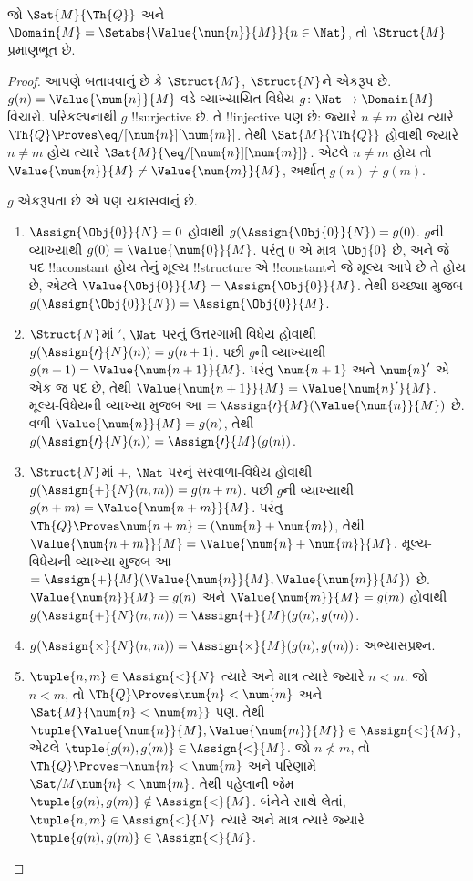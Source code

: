 \documentclass[../../../include/open-logic-section]{subfiles}
\begin{document}
\begin{prop}
જો $\Sat{M}{\Th{Q}}$ અને
$\Domain{M}=\Setabs{\Value{\num{n}}{M}}{n\in\Nat}$, તો
$\Struct{M}$ પ્રમાણભૂત છે.
\end{prop}

\begin{proof}
આપણે બતાવવાનું છે કે $\Struct{M}$, $\Struct{N}$ને એકરૂપ છે.
$g(n)=\Value{\num{n}}{M}$ વડે વ્યાખ્યાયિત વિધેય
$g\colon\Nat\to\Domain{M}$ વિચારો. પરિકલ્પનાથી $g$ !!{surjective}
છે. તે !!{injective} પણ છે: જ્યારે $n\neq m$ હોય ત્યારે
$\Th{Q}\Proves\eq/[\num{n}][\num{m}]$. તેથી
$\Sat{M}{\Th{Q}}$ હોવાથી જ્યારે $n\neq m$ હોય ત્યારે
$\Sat{M}{\eq/[\num{n}][\num{m}]}$. એટલે $n\neq m$ હોય તો
$\Value{\num{n}}{M}\neq\Value{\num{m}}{M}$, અર્થાત્ $g(n)\neq g(m)$.

$g$ એકરૂપતા છે એ પણ ચકાસવાનું છે.
\begin{enumerate}
\item $\Assign{\Obj{0}}{N}=0$ હોવાથી
  $g(\Assign{\Obj{0}}{N})=g(0)$. $g$ની વ્યાખ્યાથી
  $g(0)=\Value{\num{0}}{M}$. પરંતુ $\num{0}$ એ માત્ર $\Obj{0}$ છે,
  અને જે પદ !!a{constant} હોય તેનું મૂલ્ય !!{structure} એ
  !!{constant}ને જે મૂલ્ય આપે છે તે હોય છે, એટલે
  $\Value{\Obj{0}}{M}=\Assign{\Obj{0}}{M}$. તેથી ઇચ્છ્યા મુજબ
  $g(\Assign{\Obj{0}}{N})=\Assign{\Obj{0}}{M}$.
\item $\Struct{N}$માં $\prime$, $\Nat$ પરનું ઉત્તરગામી વિધેય હોવાથી
  $g(\Assign{\prime}{N}(n))=g(n+1)$. પછી $g$ની વ્યાખ્યાથી
  $g(n+1)=\Value{\num{n+1}}{M}$. પરંતુ $\num{n+1}$ અને
  $\num{n}'$ એ એક જ પદ છે, તેથી
  $\Value{\num{n+1}}{M}=\Value{\num{n}'}{M}$. મૂલ્ય-વિધેયની
  વ્યાખ્યા મુજબ આ
  $=\Assign{\prime}{M}(\Value{\num{n}}{M})$ છે. વળી
  $\Value{\num{n}}{M}=g(n)$, તેથી
  $g(\Assign{\prime}{N}(n))=\Assign{\prime}{M}(g(n))$.
\item $\Struct{N}$માં $+$, $\Nat$ પરનું સરવાળા-વિધેય હોવાથી
  $g(\Assign{+}{N}(n,m))=g(n+m)$. પછી $g$ની વ્યાખ્યાથી
  $g(n+m)=\Value{\num{n+m}}{M}$. પરંતુ
  $\Th{Q}\Proves\num{n+m}=(\num{n}+\num{m})$, તેથી
  $\Value{\num{n+m}}{M}=\Value{\num{n}+\num{m}}{M}$. મૂલ્ય-વિધેયની
  વ્યાખ્યા મુજબ આ
  $=\Assign{+}{M}(\Value{\num{n}}{M},\Value{\num{m}}{M})$ છે.
  $\Value{\num{n}}{M}=g(n)$ અને $\Value{\num{m}}{M}=g(m)$ હોવાથી
  $g(\Assign{+}{N}(n,m))=\Assign{+}{M}(g(n),g(m))$.
\item $g(\Assign{\times}{N}(n,m))=
  \Assign{\times}{M}(g(n),g(m))$: અભ્યાસપ્રશ્ન.
\item $\tuple{n,m}\in\Assign{<}{N}$ ત્યારે અને માત્ર ત્યારે જ્યારે
  $n<m$. જો $n<m$, તો $\Th{Q}\Proves\num{n}<\num{m}$ અને
  $\Sat{M}{\num{n}<\num{m}}$ પણ. તેથી
  $\tuple{\Value{\num{n}}{M},\Value{\num{m}}{M}}\in\Assign{<}{M}$,
  એટલે $\tuple{g(n),g(m)}\in\Assign{<}{M}$. જો $n\not<m$, તો
  $\Th{Q}\Proves\lnot\num{n}<\num{m}$ અને પરિણામે
  $\Sat/{M}{\num{n}<\num{m}}$. તેથી પહેલાની જેમ
  $\tuple{g(n),g(m)}\notin\Assign{<}{M}$. બંનેને સાથે લેતાં,
  $\tuple{n,m}\in\Assign{<}{N}$ ત્યારે અને માત્ર ત્યારે જ્યારે
  $\tuple{g(n),g(m)}\in\Assign{<}{M}$.
\end{enumerate}
\end{proof}
\end{document}

